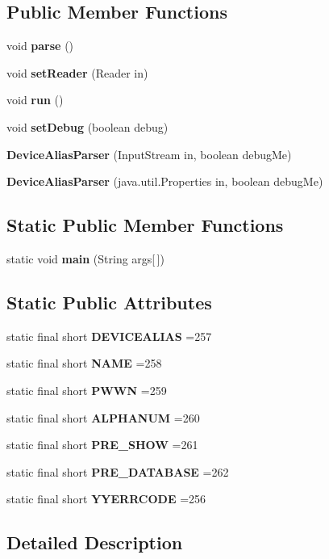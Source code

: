 \subsection*{Public Member Functions}
\begin{DoxyCompactItemize}
\item 
void {\bf parse} ()
\item 
void {\bf set\-Reader} (Reader in)
\item 
void {\bf run} ()
\item 
void {\bf set\-Debug} (boolean debug)
\item 
{\bf Device\-Alias\-Parser} (Input\-Stream in, boolean debug\-Me)
\item 
{\bf Device\-Alias\-Parser} (java.\-util.\-Properties in, boolean debug\-Me)
\end{DoxyCompactItemize}
\subsection*{Static Public Member Functions}
\begin{DoxyCompactItemize}
\item 
static void {\bf main} (String args[$\,$])
\end{DoxyCompactItemize}
\subsection*{Static Public Attributes}
\begin{DoxyCompactItemize}
\item 
static final short {\bf D\-E\-V\-I\-C\-E\-A\-L\-I\-A\-S} =257
\item 
static final short {\bf N\-A\-M\-E} =258
\item 
static final short {\bf P\-W\-W\-N} =259
\item 
static final short {\bf A\-L\-P\-H\-A\-N\-U\-M} =260
\item 
static final short {\bf P\-R\-E\-\_\-\-S\-H\-O\-W} =261
\item 
static final short {\bf P\-R\-E\-\_\-\-D\-A\-T\-A\-B\-A\-S\-E} =262
\item 
static final short {\bf Y\-Y\-E\-R\-R\-C\-O\-D\-E} =256
\end{DoxyCompactItemize}


\subsection{Detailed Description}


